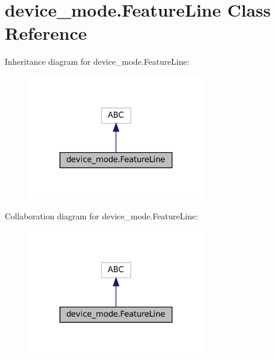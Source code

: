\hypertarget{classdevice__mode_1_1FeatureLine}{}\section{device\+\_\+mode.\+Feature\+Line Class Reference}
\label{classdevice__mode_1_1FeatureLine}


Inheritance diagram for device\+\_\+mode.\+Feature\+Line\+:
\nopagebreak
\begin{figure}[H]
\begin{center}
\leavevmode
\includegraphics[width=222pt]{classdevice__mode_1_1FeatureLine__inherit__graph}
\end{center}
\end{figure}


Collaboration diagram for device\+\_\+mode.\+Feature\+Line\+:
\nopagebreak
\begin{figure}[H]
\begin{center}
\leavevmode
\includegraphics[width=222pt]{classdevice__mode_1_1FeatureLine__coll__graph}
\end{center}
\end{figure}
